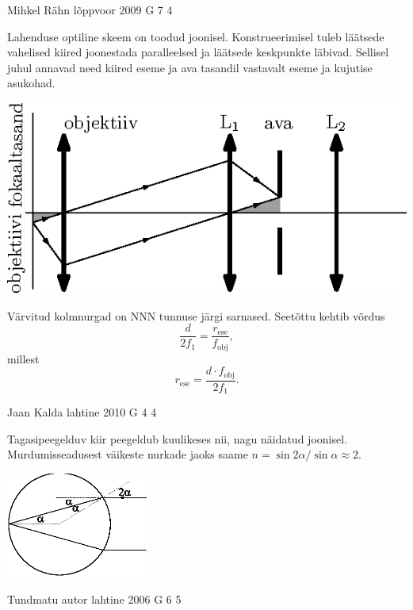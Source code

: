 \documentclass[11pt, twoside]{article}
\begin{document}
{%
{Mihkel Rähn} %
{lõppvoor} %
{2009} %
{G 7} %
{4} %
{

\ifSolution
Lahenduse optiline skeem on toodud joonisel. Konstrueerimisel tuleb
läätsede vahelised kiired joonestada paralleelsed ja läätsede keskpunkte läbivad.
Sellisel juhul annavad need kiired eseme ja ava tasandil vastavalt eseme ja kujutise
asukohad.

\begin{center}
	\includegraphics[width=0.8\linewidth]{2009-v3g-07-G_konfokaalne_mikroskoop_lah.eps}
\end{center}

Värvitud kolmnurgad on NNN tunnuse järgi sarnased. Seetõttu kehtib võrdus
\[
\frac{d}{2f_1}=\frac{r_{\mathrm{ese}}}{f_{\mathrm{obj}}},
\]
millest
\[
r_{\mathrm{ese}}=\frac{d\cdot f_{\mathrm{obj}}}{2f_1}.
\]
\fi
}

{Jaan Kalda} %
{lahtine} %
{2010} %
{G 4} %
{4} %
{

\ifSolution
Tagasipeegelduv kiir peegeldub kuulikeses nii, nagu näidatud joonisel. Murdumisseadusest väikeste nurkade jaoks saame
$n=\sin 2\alpha/\sin\alpha \approx 2.$
\begin{center}
	\includegraphics[width=0.35\textwidth]{2010-lahg-04-kuulike.eps}
\end{center}
\fi
}

{Tundmatu autor} %
{lahtine} %
{2006} %
{G 6} %
{5} %
{

}}
\end{document}
